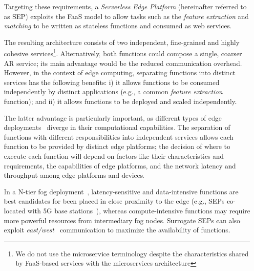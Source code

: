 Targeting these requirements, a \textit{Serverless Edge Platform} (hereinafter referred to as SEP) exploits the FaaS model to allow tasks such as the \textit{feature extraction} and \textit{matching} to be written as stateless functions and consumed as web services. 

The resulting architecture consists of two independent, fine-grained and highly cohesive services\footnote{We do not use the microservice terminology despite the  characteristics shared by FaaS-based services with the microservices architecture}. 
Alternatively, both functions could compose a single, coarser AR service; its main advantage would be the reduced communication overhead. However, in the context of edge computing, separating functions into distinct services has the following benefits:
i) it allows functions to be consumed independently by distinct applications (e.g., a common \textit{feature extraction} function); and ii) it allows functions to be deployed and scaled independently.%

The latter advantage is particularly important, as different types of edge deployments~\cite{Satyanarayanan:2009,Taleb:2013,Liu:2014} 
diverge in their computational capabilities. The separation of functions with different responsibilities 
into independent services allows each function to be provided by distinct edge platforms; the decision of where to execute each function will depend on factors like their characteristics and requirements, the capabilities of edge platforms, and the network latency and throughput among edge platforms and devices. 

In a N-tier fog deployment~\cite{OpenFog:RA:2017}, latency-sensitive and data-intensive functions are best candidates for been placed in close proximity to the edge (e.g., SEPs co-located with 5G base stations~\cite{ETSI:MEC:2016:03}), whereas compute-intensive functions may require more powerful resources from intermediary fog nodes. Surrogate SEPs can also exploit \textit{east/west}~\cite{OpenFog:RA:2017} communication to maximize the availability of functions.

